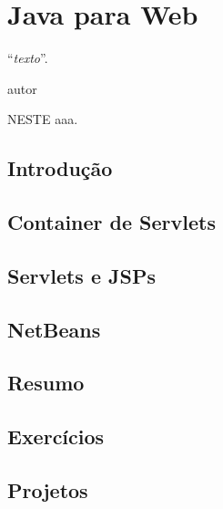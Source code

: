 \chapter{Java para Web}
\epigraph{``\textit{texto}''.}{autor}

\lettrine[lines=4, lhang=0.1, lraise=0, loversize=0.2, findent=0.1em]{\textcolor{corAzulTema}{N}}{ESTE} aaa.

\section{Introdução}

\section{Container de Servlets}

\section{Servlets e JSPs}

\section{NetBeans}

\section{Resumo}

\section{Exercícios}

\section{Projetos}